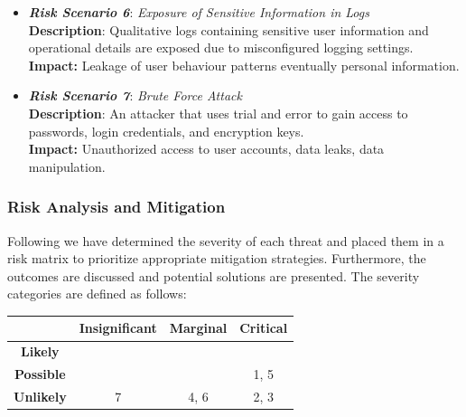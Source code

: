 \documentclass{article}
\begin{document}
\begin{itemize}
\item\textit{\textbf{Risk Scenario 6}}: \textit{Exposure of Sensitive Information in Logs} \\
\textbf{Description}: Qualitative logs containing sensitive user information and operational details are exposed due to misconfigured logging settings.\\
\textbf{Impact:} Leakage of user behaviour patterns eventually personal information.\\

\item\textit{\textbf{Risk Scenario 7}}: \textit{Brute Force Attack} \\
\textbf{Description}: An attacker that uses trial and error to gain access to passwords, login credentials, and encryption keys.\\
\textbf{Impact:} Unauthorized access to user accounts, data leaks, data manipulation.\\
\end{itemize}

\subsubsection{Risk Analysis and Mitigation}

Following we have determined the severity of each threat and placed them in a risk matrix to prioritize appropriate mitigation strategies. Furthermore, the outcomes are discussed and potential solutions are presented. The severity categories are defined as follows:


\begin{table}[h!]
\centering
\small
{} 
\renewcommand{\arraystretch}{1.5} 
\begin{tabular}{|c|c|c|c|}
\hline
\rowcolor{white}
& \textbf{Insignificant} & \textbf{Marginal} & \textbf{Critical} \\
\hline
\textbf{Likely} & \cellcolor{mediumrisk} & \cellcolor{highrisk} & \cellcolor{highrisk} \\
\hline
\textbf{Possible} & \cellcolor{lowrisk} & \cellcolor{mediumrisk}  & \cellcolor{highrisk} 1, 5 \\
\hline
\textbf{Unlikely} & \cellcolor{lowrisk} 7 & \cellcolor{lowrisk} 4, 6  & \cellcolor{mediumrisk} 2, 3 \\
\hline
\end{tabular}
\end{table}
\end{document}
